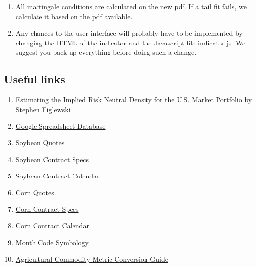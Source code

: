 \documentclass[10pt,a4paper]{book}
\begin{document}
\begin{enumerate}
  \item All martingale conditions are calculated on the new pdf. If a tail fit fails, we calculate it based on the pdf available.
  \item Any chances to the user interface will probably have to be implemented by changing the HTML of the indicator and the Javascript file indicator.js. We suggest you back up everything before doing such a change.
\end{enumerate}

\subsection{Useful links}
\begin{enumerate}
\item \href{http://faculty.baruch.cuny.edu/lwu/890/FiglewskiRND_draft7.pdf}{Estimating the Implied Risk Neutral Density for the U.S. Market Portfolio by Stephen Figlewski}
\item \href{https://docs.google.com/spreadsheets/d/18GAQ_Rk8IFyiwPd2wjh_4VAdpe0bmxBvUxWXxIIhoZ4/edit#gid=0}{Google Spreadsheet Database}
\item \href{www.cmegroup.com/trading/agricultural/grain-and-oilseed/soybean_quotes_globex_options.html}{Soybean Quotes}
\item \href{http://www.cmegroup.com/trading/agricultural/grain-and-oilseed/soybean_contractSpecs_options.html}{Soybean Contract Specs}
\item \href{http://www.cmegroup.com/trading/agricultural/grain-and-oilseed/soybean_product_calendar_options.html}{Soybean Contract Calendar}
\item \href{http://www.cmegroup.com/trading/agricultural/grain-and-oilseed/corn_quotes_globex_options.html}{Corn Quotes}
\item \href{http://www.cmegroup.com/trading/agricultural/grain-and-oilseed/corn_quotes_globex_options.html}{Corn Contract Specs}
\item \href{http://www.cmegroup.com/trading/agricultural/grain-and-oilseed/corn_product_calendar_options.html}{Corn Contract Calendar}
\item \href{http://www.crbtrader.com/support/symbology.asp}{Month Code Symbology}
\item \href{http://www.cmegroup.com/trading/agricultural/files/AC-225_MetricGuide.pdf}{Agricultural Commodity Metric Conversion Guide}
\end{enumerate}
\end{document}
